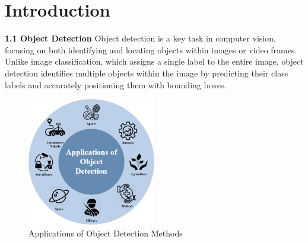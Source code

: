 \chapter{Introduction} 
%
%
{ \textbf{1.1 {Object Detection}}}\newline
\newline
%
%
Object detection is a key task in computer vision, focusing on both identifying and locating objects within images or video frames. Unlike image classification, which assigns a single label to the entire image, object detection identifies multiple objects within the image by predicting their class labels and accurately positioning them with bounding boxes. \newline
\\
%
\begin{figure}[h!] 
    \centering
    \includegraphics[width=0.5\textwidth]{images/Object Detection Application.png}
    \caption{Applications of Object Detection Methods}
  \end{figure}
\\\\
